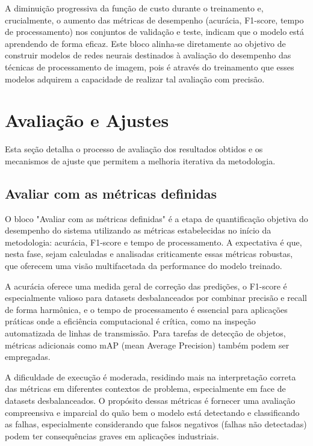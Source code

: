 A diminuição progressiva da função de custo durante o treinamento e, crucialmente, o aumento das métricas de desempenho (acurácia, F1-score, tempo de processamento) nos conjuntos de validação e teste, indicam que o modelo está aprendendo de forma eficaz. Este bloco alinha-se diretamente ao objetivo de construir modelos de redes neurais destinados à avaliação do desempenho das técnicas de processamento de imagem, pois é através do treinamento que esses modelos adquirem a capacidade de realizar tal avaliação com precisão.

\section{Avaliação e Ajustes}

Esta seção detalha o processo de avaliação dos resultados obtidos e os mecanismos de ajuste que permitem a melhoria iterativa da metodologia.

\subsection{Avaliar com as métricas definidas}
O bloco "Avaliar com as métricas definidas" é a etapa de quantificação objetiva do desempenho do sistema utilizando as métricas estabelecidas no início da metodologia: acurácia, F1-score e tempo de processamento. A expectativa é que, nesta fase, sejam calculadas e analisadas criticamente essas métricas robustas, que oferecem uma visão multifacetada da performance do modelo treinado.

A acurácia oferece uma medida geral de correção das predições, o F1-score é especialmente valioso para datasets desbalanceados por combinar precisão e recall de forma harmônica, e o tempo de processamento é essencial para aplicações práticas onde a eficiência computacional é crítica, como na inspeção automatizada de linhas de transmissão. Para tarefas de detecção de objetos, métricas adicionais como mAP (mean Average Precision) também podem ser empregadas.

A dificuldade de execução é moderada, residindo mais na interpretação correta das métricas em diferentes contextos de problema, especialmente em face de datasets desbalanceados. O propósito dessas métricas é fornecer uma avaliação compreensiva e imparcial do quão bem o modelo está detectando e classificando as falhas, especialmente considerando que falsos negativos (falhas não detectadas) podem ter consequências graves em aplicações industriais.

